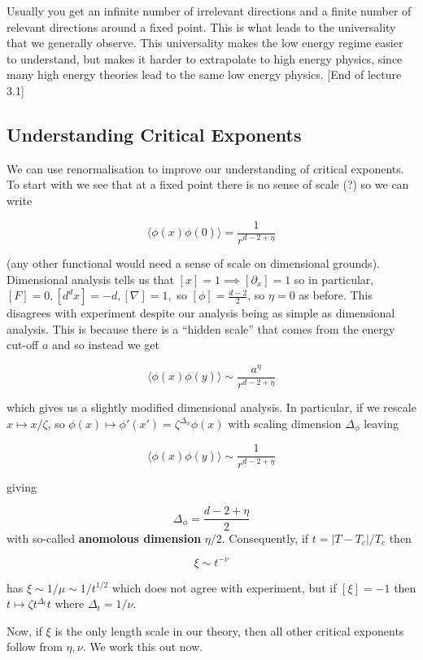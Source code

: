 \documentclass{article}
\theoremstyle{definition}
\begin{document}
Usually you get an infinite number of irrelevant directions and a finite number
of relevant directions around a fixed point. This is what leads to the
universality that we generally observe. This universality makes the low energy
regime easier to understand, but makes it harder to extrapolate to high energy
physics, since many high energy theories lead to the same low energy physics.
[End of lecture 3.1]

\subsection{Understanding Critical Exponents}

We can use renormalisation to improve our understanding of critical exponents.
To start with we see that at a fixed point there is no sense of scale (?) so we
can write

$$ \langle \phi(x) \phi(0) \rangle = \frac{1}{r^{d - 2 + \eta}} $$

(any other functional would need a sense of scale on dimensional grounds).
Dimensional analysis tells us that $[x] = 1 \implies [\partial_x] = 1$ so in
particular, $[F] = 0, [d^dx] = -d, [\nabla] = 1,$ so $[\phi] = \frac{d - 2}{2}$,
so $\eta = 0$ as before. This disagrees with experiment despite our analysis
being as simple as dimensional analysis. This is because there is a ``hidden
scale'' that comes from the energy cut-off $a$ and so instead we get

$$ \langle \phi(x) \phi(y) \rangle \sim \frac{a^\eta}{r^{d - 2 + \eta}} $$

which gives us a slightly modified dimensional analysis. In particular, if we
rescale $x \mapsto x / \zeta$, so $\phi(x) \mapsto \phi'(x') =
\zeta^{\Delta_\phi} \phi(x)$ with scaling dimension $\Delta_\phi$ leaving

$$ \langle \phi(x) \phi(y) \rangle \sim \frac{1}{r^{d - 2 + \eta}} $$

giving

$$ \Delta_\phi = \frac{d - 2 + \eta}{2}$$ with so-called \textbf{anomolous
  dimension} $\eta / 2$. Consequently, if $t = |T - T_c| / T_c$ then

$$ \xi \sim t^{-\nu} $$

has $\xi \sim 1/\mu \sim 1 / t^{1/2}$ which does not agree with experiment, but
if $[\xi] = -1$ then $t \mapsto \zeta t^{\Delta_t} t$ where $\Delta_t = 1 /
\nu$.

Now, if $\xi$ is the only length scale in our theory, then all other critical
exponents follow from $\eta, \nu$. We work this out now.
\end{document}
